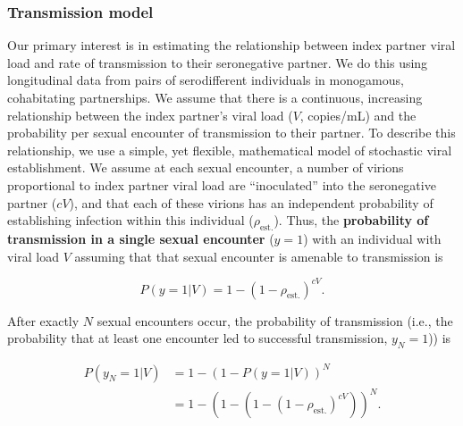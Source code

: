 \documentclass{article}[11pt]
\begin{document}



\subsubsection*{Transmission model}
Our primary interest is in estimating the relationship between index partner viral load and rate of transmission to their seronegative partner. We do this using longitudinal data from pairs of serodifferent individuals in monogamous, cohabitating partnerships. We assume that there is a continuous, increasing relationship between the index partner's viral load ($V$, copies/mL) and the probability per sexual encounter of transmission to their partner. To describe this relationship, we use a simple, yet flexible, mathematical model of stochastic viral establishment.  We assume at each sexual encounter, a number of virions proportional to index partner viral load are ``inoculated'' into the seronegative partner ($c V$), and that each of these virions has an independent probability of establishing infection within this individual ($\rho_{\text{est.}}$). Thus, the \textbf{probability of transmission in a single sexual encounter} ($y=1$) with an individual with viral load $V$ assuming that that sexual encounter is amenable to transmission is

\begin{equation}
P(y=1|V) = 1-\left(1-\rho_{\text{est.}}\right)^{c V}.
\end{equation}

After exactly $N$ sexual encounters occur, the probability of transmission (i.e., the probability that at least one encounter led to successful transmission, $y_N=1$)) is

\begin{equation}
\begin{split}
P(y_N=1|V) & = 1-\left(1-P(y=1|V)\right)^N\\
& = 1-\left(1-\left(1-\left(1-\rho_{\text{est.}}\right)^{c V}\right)\right)^{N}.
\end{split}
\end{equation}
\end{document}
